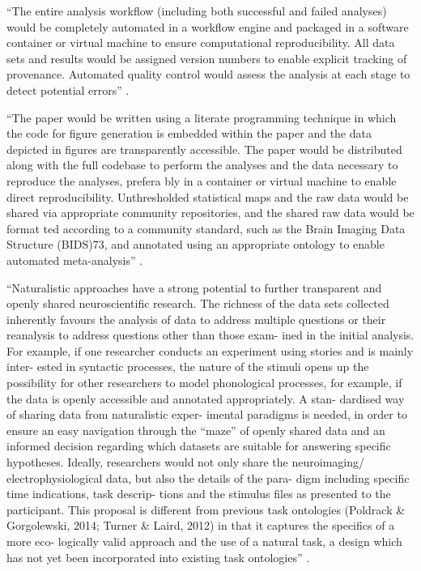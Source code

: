 ``The entire analysis workflow (including both successful and failed analyses)
would be completely automated in a workflow engine and packaged in a software
container or virtual machine to ensure computational reproducibility. All data
sets and results would be assigned version numbers to enable explicit tracking
of provenance. Automated quality control would assess the analysis at each stage
to detect potential errors'' \citep{poldrack2017scanning}.

``The paper would be written using a literate programming technique in which the
code for figure generation is embedded within the paper and the data depicted in
figures are transparently accessible. The paper would be distributed along with
the full codebase to perform the analyses and the data necessary to reproduce
the analyses, prefera­ bly in a container or virtual machine to enable direct
reproducibility. Unthresholded statistical maps and the raw data would be shared
via appropriate community repositories, and the shared raw data would be format­
ted according to a community standard, such as the Brain Imaging Data Structure
(BIDS)73, and annotated using an appropriate ontology to enable automated
meta-analysis'' \citep{poldrack2017scanning}.


``Naturalistic approaches have a strong potential to further transparent and
openly shared neuroscientiﬁc research.  The richness of the data sets collected
inherently favours the analysis of data to address multiple questions or their
reanalysis to address questions other than those exam- ined in the initial
analysis. For example, if one researcher conducts an experiment using stories
and is mainly inter- ested in syntactic processes, the nature of the stimuli
opens up the possibility for other researchers to model phonological processes,
for example, if the data is openly accessible and annotated appropriately. A
stan- dardised way of sharing data from naturalistic exper- imental paradigms is
needed, in order to ensure an easy navigation through the “maze” of openly
shared data and an informed decision regarding which datasets are suitable for
answering speciﬁc hypotheses. Ideally, researchers would not only share the
neuroimaging/ electrophysiological data, but also the details of the para- digm
including speciﬁc time indications, task descrip- tions and the stimulus ﬁles as
presented to the participant. This proposal is diﬀerent from previous task
ontologies (Poldrack \& Gorgolewski, 2014; Turner \& Laird, 2012) in that it
captures the speciﬁcs of a more eco- logically valid approach and the use of a
natural task, a design which has not yet been incorporated into existing task
ontologies'' \citep{kandylaki2019story}.

